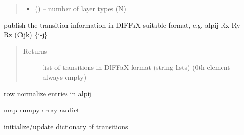 \documentclass[letterpaper,10pt,english]{sphinxmanual}
\begin{document}
\begin{fulllineitems}
\begin{fulllineitems}
\begin{quote}
\begin{description}
\begin{itemize}
\item {} 
 () -- number of layer types (N)

\end{itemize}

\end{description}\end{quote}

\end{fulllineitems}


\begin{fulllineitems}
\label{\detokenize{rst/transition:mstack.transition.Transitions.pub_trans}}
publish the transition information in DIFFaX suitable format, e.g.
alpij Rx Ry Rz (Cijk) \{i-j\}
\begin{quote}\begin{description}
\item[{Returns}] \leavevmode
list of transitions in DIFFaX format (string lists) (0th element always empty)

\end{description}\end{quote}

\end{fulllineitems}


\begin{fulllineitems}
\label{\detokenize{rst/transition:mstack.transition.Transitions.row_normal}}
row normalize entries in alpij

\end{fulllineitems}


\begin{fulllineitems}
\label{\detokenize{rst/transition:mstack.transition.Transitions.todict}}
map numpy array as dict

\end{fulllineitems}


\begin{fulllineitems}
\label{\detokenize{rst/transition:mstack.transition.Transitions.update_transitions}}
initialize/update dictionary of transitions


\end{fulllineitems}
\end{fulllineitems}
\end{document}
